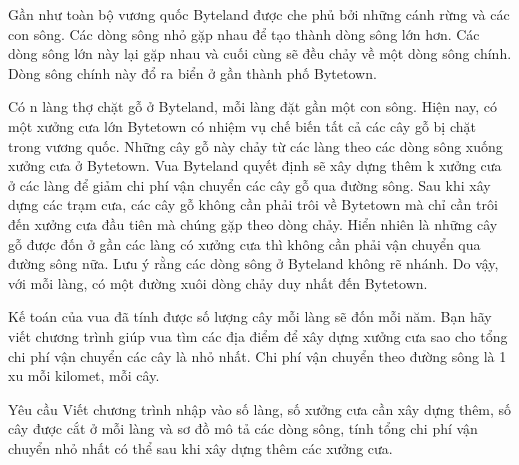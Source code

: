 Gần như toàn bộ vương quốc Byteland được che phủ bởi những cánh rừng và các con sông. Các dòng sông nhỏ gặp nhau để tạo thành dòng sông lớn hơn. Các dòng sông lớn này lại gặp nhau và cuối cùng sẽ đều chảy về một dòng sông chính. Dòng sông chính này đổ ra biển ở gần thành phố Bytetown.  

   Có n làng thợ chặt gỗ ở Byteland, mỗi làng đặt gần một con sông. Hiện nay, có một xưởng cưa lớn Bytetown có nhiệm vụ chế biến tất cả các cây gỗ bị chặt trong vương quốc. Những cây gỗ này chảy từ các làng theo các dòng sông xuống xưởng cưa ở Bytetown. Vua Byteland quyết định sẽ xây dựng thêm k xưởng cưa ở các làng để giảm chi phí vận chuyển các cây gỗ qua đường sông. Sau khi xây dựng các trạm cưa, các cây gỗ không cần phải trôi về Bytetown mà chỉ cần trôi đến xưởng cưa đầu tiên mà chúng gặp theo dòng chảy. Hiển nhiên là những cây gỗ được đốn ở gần các làng có xưởng cưa thì không cần phải vận chuyển qua đường sông nữa. Lưu ý rằng các dòng sông ở Byteland không rẽ nhánh. Do vậy, với mỗi làng, có một đường xuôi dòng chảy duy nhất đến Bytetown.  

   Kế toán của vua đã tính được số lượng cây mỗi làng sẽ đốn mỗi năm. Bạn hãy viết chương trình giúp vua tìm các địa điểm để xây dựng xưởng cưa sao cho tổng chi phí vận chuyển các cây là nhỏ nhất. Chi phí vận chuyển theo đường sông là 1 xu mỗi kilomet, mỗi cây.  

Yêu cầu
Viết chương trình nhập vào số làng, số xưởng cưa cần xây dựng thêm, số cây được cắt ở mỗi làng và sơ đồ mô tả các dòng sông, tính tổng chi phí vận chuyển nhỏ nhất có thể sau khi xây dựng thêm các xưởng cưa.